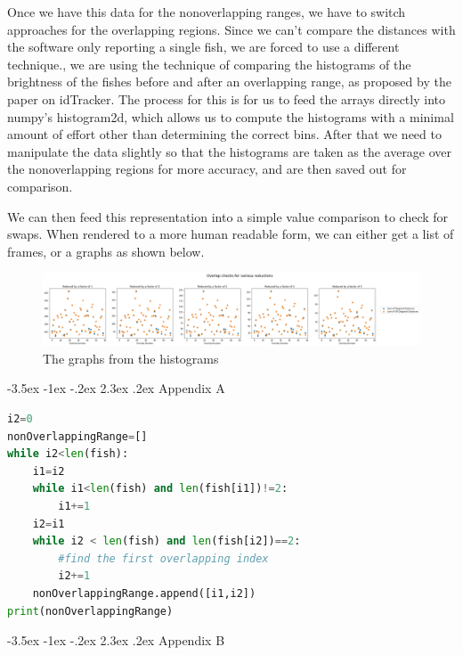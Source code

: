 \documentclass{article}
\makeatletter
\renewcommand\section{\clearpage\newpage\@startsection {section}{1}{\z@}%
	{-3.5ex \@plus -1ex \@minus -.2ex}%
	{2.3ex \@plus.2ex}%
	{\normalfont\Large\bfseries}}
\makeatother
\begin{document}
Once we have this data for the nonoverlapping ranges, we have to switch approaches for the overlapping regions. Since we can't compare the distances with the software only reporting a single fish, we are forced to use a different technique., we are using the technique of comparing the histograms of the brightness of the fishes before and after an overlapping range, as proposed by the paper on idTracker\cite{idTracker}. The process for this is for us to feed the arrays directly into numpy's histogram2d, which allows us to compute the histograms with a minimal amount of effort other than determining the correct bins. After that we need to manipulate the data slightly so that the histograms are taken as the average over the nonoverlapping regions for more accuracy, and are then saved out for comparison.

We can then feed this representation into a simple value comparison to check for swaps. When rendered to a more human readable form, we can either get a list of frames, or a graphs as shown below.

\begin{figure}[H]
	\centering
	\includegraphics[width=\linewidth]{reducedGraph}
	\caption{The graphs from the histograms}
	\label{fig:reducedGraph}
\end{figure}


\appendix
\section{Appendix A}
\label{appendix1}

\begin{minipage}[c]{\textwidth}
\begin{lstlisting}[language=Python]
i2=0
nonOverlappingRange=[]
while i2<len(fish):
    i1=i2
    while i1<len(fish) and len(fish[i1])!=2:
        i1+=1
    i2=i1
    while i2 < len(fish) and len(fish[i2])==2:
        #find the first overlapping index
        i2+=1
    nonOverlappingRange.append([i1,i2])
print(nonOverlappingRange)
\end{lstlisting}
\end{minipage}

\section{Appendix B}
\label{app:swapStatus}
\end{document}
